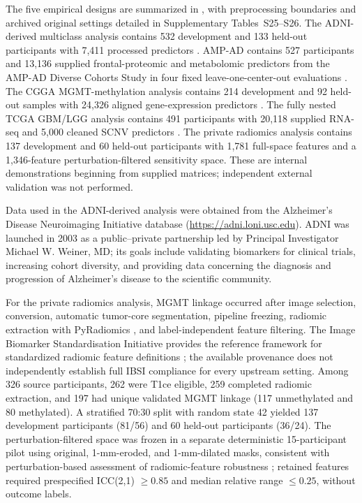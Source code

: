 The five empirical designs are summarized in , with preprocessing boundaries and archived original settings detailed in Supplementary Tables~S25--S26. The ADNI-derived multiclass analysis contains 532 development and 133 held-out participants with 7,411 processed predictors \citep{ref20,ref21}. AMP-AD contains 527 participants and 13,136 supplied frontal-proteomic and metabolomic predictors from the AMP-AD Diverse Cohorts Study in four fixed leave-one-center-out evaluations \citep{ref37}. The CGGA MGMT-methylation analysis contains 214 development and 92 held-out samples with 24,326 aligned gene-expression predictors \citep{ref23}. The fully nested TCGA GBM/LGG analysis contains 491 participants with 20,118 supplied RNA-seq and 5,000 cleaned SCNV predictors \citep{ref44,ref45}. The private radiomics analysis contains 137 development and 60 held-out participants with 1,781 full-space features and a 1,346-feature perturbation-filtered sensitivity space. These are internal demonstrations beginning from supplied matrices; independent external validation was not performed.

Data used in the ADNI-derived analysis were obtained from the Alzheimer's Disease Neuroimaging Initiative database (\url{https://adni.loni.usc.edu}). ADNI was launched in 2003 as a public--private partnership led by Principal Investigator Michael W. Weiner, MD; its goals include validating biomarkers for clinical trials, increasing cohort diversity, and providing data concerning the diagnosis and progression of Alzheimer's disease to the scientific community.



For the private radiomics analysis, MGMT linkage occurred after image selection, conversion, automatic tumor-core segmentation, pipeline freezing, radiomic extraction with PyRadiomics \citep{ref43}, and label-independent feature filtering. The Image Biomarker Standardisation Initiative provides the reference framework for standardized radiomic feature definitions \citep{ref42}; the available provenance does not independently establish full IBSI compliance for every upstream setting. Among 326 source participants, 262 were T1ce eligible, 259 completed radiomic extraction, and 197 had unique validated MGMT linkage (117 unmethylated and 80 methylated). A stratified 70:30 split with random state 42 yielded 137 development participants (81/56) and 60 held-out participants (36/24). The perturbation-filtered space was frozen in a separate deterministic 15-participant pilot using original, 1-mm-eroded, and 1-mm-dilated masks, consistent with perturbation-based assessment of radiomic-feature robustness \citep{ref41}; retained features required prespecified ICC(2,1) \(\geq0.85\) and median relative range \(\leq0.25\), without outcome labels.

